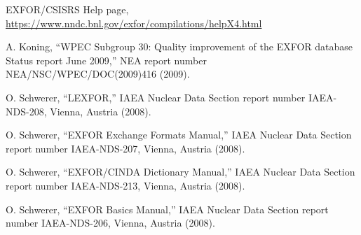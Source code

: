 \documentclass[11pt]{article}
\begin{document}

 EXFOR/CSISRS Help page, \url{https://www.nndc.bnl.gov/exfor/compilations/helpX4.html}

 A. Koning, ``WPEC Subgroup 30: Quality improvement of the EXFOR database Status report  June 2009,'' NEA report number NEA/NSC/WPEC/DOC(2009)416 (2009).

 O. Schwerer, ``LEXFOR,'' IAEA Nuclear Data Section report number IAEA-NDS-208, Vienna,  Austria (2008).

 O. Schwerer, ``EXFOR Exchange Formats Manual,'' IAEA Nuclear Data Section report number  IAEA-NDS-207, Vienna, Austria (2008).

 O. Schwerer, ``EXFOR/CINDA Dictionary Manual,'' IAEA Nuclear Data Section report number IAEA-NDS-213, Vienna, Austria (2008).

 O. Schwerer, ``EXFOR Basics Manual,''  IAEA Nuclear Data Section report number IAEA-NDS-206, Vienna, Austria (2008).
\end{document}
